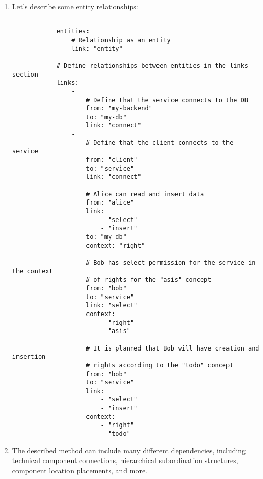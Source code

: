 \documentclass[final]{article}
\begin{document}
\begin{enumerate}
            \item Let's describe some entity relationships:

            \begin{verbatim}

            entities:
                # Relationship as an entity
                link: "entity"

            # Define relationships between entities in the links section
            links:
                -
                    # Define that the service connects to the DB
                    from: "my-backend"
                    to: "my-db"
                    link: "connect"
                -
                    # Define that the client connects to the service
                    from: "client"
                    to: "service"
                    link: "connect"
                -
                    # Alice can read and insert data
                    from: "alice"
                    link:
                        - "select"
                        - "insert"
                    to: "my-db"
                    context: "right"
                -
                    # Bob has select permission for the service in the context 
                    # of rights for the "asis" concept
                    from: "bob"
                    to: "service"
                    link: "select"
                    context:
                        - "right"
                        - "asis"
                -
                    # It is planned that Bob will have creation and insertion 
                    # rights according to the "todo" concept
                    from: "bob"
                    to: "service"
                    link:
                        - "select"
                        - "insert"
                    context:
                        - "right"
                        - "todo"

            \end{verbatim}

            \item The described method can include many different dependencies, 
            including technical component connections, hierarchical subordination 
            structures, component location placements, and more.

        \end{enumerate}
\end{document}
